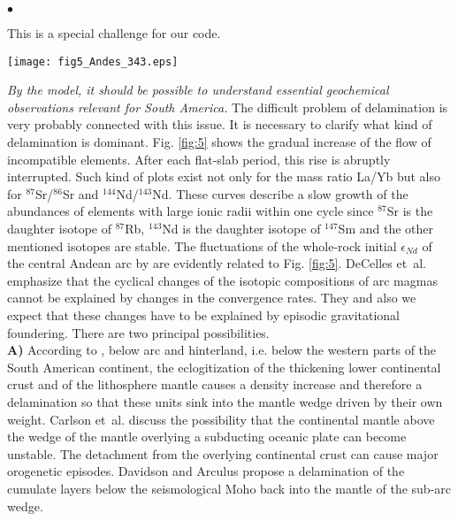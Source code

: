 \documentclass[twoside,10pt]{article}
\newenvironment{dlist}
   {\begin{list}
      {$\bullet$}
      {
      \setlength{\topsep}{0.5ex}
      \setlength{\partopsep}{0.0ex}
      \setlength{\parsep}{0.5ex}
      \setlength{\itemsep}{0.0ex}
      \setlength{\itemindent}{3.0ex}
      \setlength{\leftmargin}{0.0ex}
      \setlength{\labelsep}{1.0ex}
      }
   }
   {\end{list}}
\begin{document}
\begin{dlist}
This is a special challenge for our code.
\begin{SCfigure}[1][htb!]
\centering
\texttt{[image: fig5\_Andes\_343.eps]}
\caption{The La/Yb ratio as a function of time for the igneous rocks of the north Chilean arc (21-26\textdegree~S) acc. to Haschke et.~al. \cite{Haschke2006}.
Note that \emph{after} the flat-slab stage, the La/Yb \emph{suddenly} decreases to a low starting value.
The periods of orogenetic activity are \emph{before} these drops.}
 \label{fig:5}
\end{SCfigure}
 \item \emph{By the model, it should be possible to understand essential geochemical observations relevant for South America.}
The difficult problem of delamination is very probably connected with this issue.
It is necessary to clarify what kind of delamination is dominant. 
Fig. \ref{fig:5} shows the gradual increase of the flow of incompatible elements.
After each flat-slab period, this rise is abruptly interrupted. 
Such kind of plots exist not only for the mass ratio La/Yb but also for $^{87}$Sr/$^{86}$Sr and $^{144}$Nd/$^{143}$Nd.
These curves describe a slow growth of the abundances of elements with large ionic radii within one cycle since $^{87}$Sr is the daughter isotope of $^{87}$Rb, $^{143}$Nd is the daughter isotope of $^{147}$Sm and the other mentioned isotopes are stable. 
The fluctuations of the whole-rock initial $\epsilon_{Nd}$ of the central Andean arc by \cite{DeCelles2009} are evidently related to Fig. \ref{fig:5}. 
DeCelles et~al. \cite{DeCelles2009} emphasize that the cyclical changes of the isotopic compositions of arc magmas cannot be explained by changes in the convergence rates. 
They and also we expect that these changes have to be explained by episodic gravitational foundering. There are two principal possibilities.\\
\textbf{A)} According to \cite{DeCelles2009}, below arc and hinterland, i.e. below the western parts of the South American continent, the eclogitization of the thickening lower continental crust and of the lithosphere mantle causes a density increase and therefore a delamination so that these units sink into the mantle wedge driven by their own weight. 
Carlson et~al. \cite{Carlson2005} discuss the possibility that the continental mantle above the wedge of the mantle overlying a subducting oceanic plate can become unstable.
The detachment from the overlying continental crust can cause major orogenetic episodes. 
Davidson and Arculus \cite{Davidson2006} propose a delamination of the cumulate layers below the seismological Moho back into the mantle of the sub-arc wedge.

\end{dlist}
\end{document}

